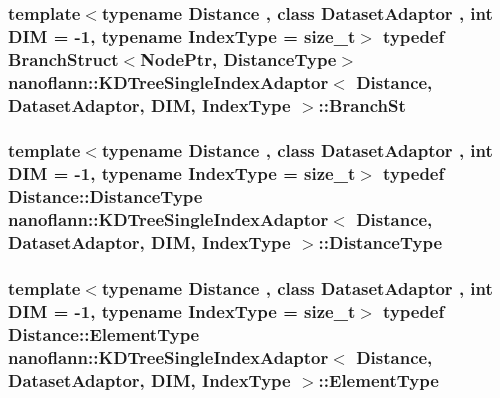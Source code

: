 \hypertarget{classnanoflann_1_1_k_d_tree_single_index_adaptor_adda19fa01ea32ec1df0e9c3e8f7aecc8}{
\subsubsection[{Branch\-St}]{\setlength{\rightskip}{0pt plus 5cm}template$<$typename Distance , class Dataset\-Adaptor , int D\-I\-M = -\/1, typename Index\-Type  = size\-\_\-t$>$ typedef {\bf Branch\-Struct}$<${\bf Node\-Ptr}, {\bf Distance\-Type}$>$ {\bf nanoflann\-::\-K\-D\-Tree\-Single\-Index\-Adaptor}$<$ Distance, Dataset\-Adaptor, D\-I\-M, Index\-Type $>$\-::{\bf Branch\-St}\hspace{0.3cm}{\ttfamily [protected]}}}\label{classnanoflann_1_1_k_d_tree_single_index_adaptor_adda19fa01ea32ec1df0e9c3e8f7aecc8}
\hypertarget{classnanoflann_1_1_k_d_tree_single_index_adaptor_addc764e7c19cc85c89b3903338e5a910}{
\subsubsection[{Distance\-Type}]{\setlength{\rightskip}{0pt plus 5cm}template$<$typename Distance , class Dataset\-Adaptor , int D\-I\-M = -\/1, typename Index\-Type  = size\-\_\-t$>$ typedef Distance\-::\-Distance\-Type {\bf nanoflann\-::\-K\-D\-Tree\-Single\-Index\-Adaptor}$<$ Distance, Dataset\-Adaptor, D\-I\-M, Index\-Type $>$\-::{\bf Distance\-Type}}}\label{classnanoflann_1_1_k_d_tree_single_index_adaptor_addc764e7c19cc85c89b3903338e5a910}
\hypertarget{classnanoflann_1_1_k_d_tree_single_index_adaptor_a21652a3919382d558291f80cefad8770}{
\subsubsection[{Element\-Type}]{\setlength{\rightskip}{0pt plus 5cm}template$<$typename Distance , class Dataset\-Adaptor , int D\-I\-M = -\/1, typename Index\-Type  = size\-\_\-t$>$ typedef Distance\-::\-Element\-Type {\bf nanoflann\-::\-K\-D\-Tree\-Single\-Index\-Adaptor}$<$ Distance, Dataset\-Adaptor, D\-I\-M, Index\-Type $>$\-::{\bf Element\-Type}}}\label{classnanoflann_1_1_k_d_tree_single_index_adaptor_a21652a3919382d558291f80cefad8770}

